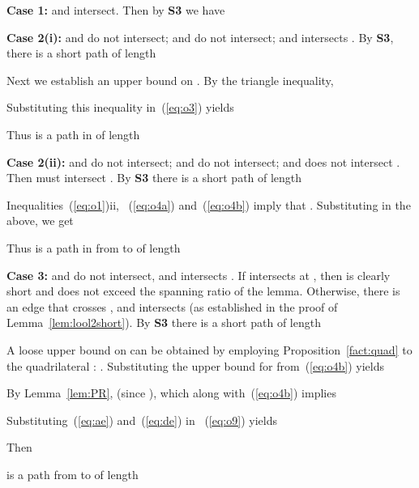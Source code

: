 \pdfoutput=1  \documentclass[11pt]{article}
\begin{document}
\medskip
\noindent
{\bf Case 1:}  and  intersect. Then by {\bf S3} we have



\medskip
\noindent
{\bf Case 2(i):}
 and  do not intersect;
 and  do not intersect;
and  intersects .
By {\bf S3}, there is a short path  of length

Next we establish an upper bound on . By the triangle inequality,

Substituting this inequality in~(\ref{eq:o3}) yields

Thus  is a path in  of length


\medskip
\noindent
{\bf Case 2(ii):}
 and  do not intersect;
 and  do not intersect;
and  does not intersect .
Then  must intersect
.
By {\bf S3} there is a short path  of length

Inequalities~(\ref{eq:o1})ii, ~(\ref{eq:o4a}) and~(\ref{eq:o4b}) imply that
. Substituting in the above,
we get

Thus  is a path in  from  to  of length


\medskip
\noindent
{\bf Case 3:}  and  do not intersect,
and  intersects .
If  intersects  at , then
 is clearly short and
does not exceed the spanning ratio of the lemma.
Otherwise, there is an edge 
that crosses , and
 intersects 
(as established in the proof of Lemma~\ref{lem:lool2short}).
By {\bf S3} there is a short path  of length

A loose upper bound on  can be obtained by employing
Proposition~\ref{fact:quad}
to the quadrilateral
: . Substituting the upper bound for
 from~(\ref{eq:o4b}) yields

By Lemma~\ref{lem:PR},  (since ), which
along with~(\ref{eq:o4b}) implies

Substituting~(\ref{eq:ae}) and~(\ref{eq:de}) in ~(\ref{eq:o9}) yields

Then

is a path from  to  of length
\end{document}
